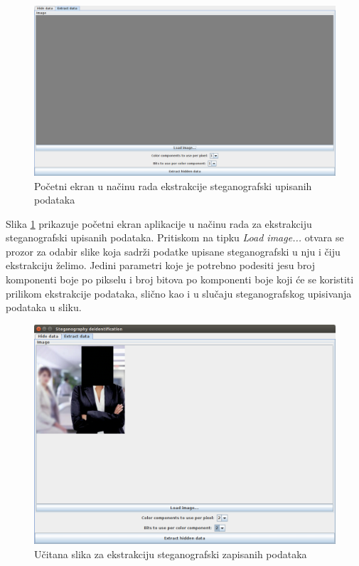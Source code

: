 \documentclass[times, utf8, seminar]{fer}
\begin{document}
\begin{figure}[H]
\caption{Početni ekran u načinu rada ekstrakcije steganografski upisanih podataka}
\label{app_home_screen_extract}
\centerline{\includegraphics[scale=0.4]{images/app_home_screen_extract.png}}
\end{figure}

Slika \ref{app_home_screen_extract} prikazuje početni ekran aplikacije u načinu rada za ekstrakciju steganografski upisanih podataka. Pritiskom na tipku \textit{Load image...} otvara se prozor za odabir slike koja sadrži podatke upisane steganografski u nju i čiju ekstrakciju želimo. Jedini parametri koje je potrebno podesiti jesu broj komponenti boje po pikselu i broj bitova po komponenti boje koji će se koristiti prilikom ekstrakcije podataka, slično kao i u slučaju steganografskog upisivanja podataka u sliku.

\begin{figure}[H]
\caption{Učitana slika za ekstrakciju steganografski zapisanih podataka}
\label{app_loaded_screen_extract}
\centerline{\includegraphics[scale=0.4]{images/app_loaded_screen_extract.png}}
\end{figure}
\end{document}
